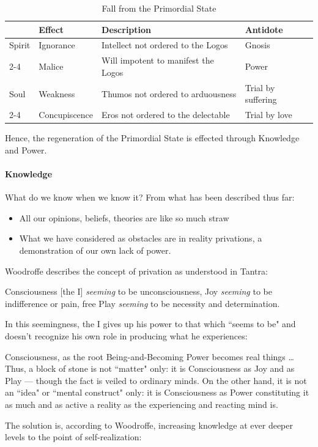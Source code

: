 \begin{table}[h]
\centering\small
\begin{tabularx}{\textwidth}{llp{}l}
\toprule
 &
\textbf{Effect} &
\textbf{Description} &
\textbf{Antidote}\\\midrule
Spirit &
Ignorance &
Intellect not ordered to the Logos &
Gnosis\\\cmidrule{2-4}
 &
Malice &
Will impotent to manifest the Logos &
Power\\\midrule
Soul &
Weakness &
Thumos not ordered to arduousness &
Trial by suffering\\\cmidrule{2-4}
 &
Concupiscence &
Eros not ordered to the delectable &
Trial by love\\\bottomrule
\end{tabularx}
\caption{Fall from the Primordial State}
\label{tab:FallPrimordialState}
\end{table}
Hence, the regeneration of the Primordial State is effected through Knowledge and Power.

\paragraph{Knowledge}
What do we know when we know it? From what has been described thus far:

\begin{itemize}
\item All our opinions, beliefs, theories are like so much straw 
\item What we have considered as obstacles are in reality privations, a demonstration of our own lack of power. 
\end{itemize}
Woodroffe describes the concept of privation as understood in Tantra:

\begin{quotex}
Consciousness [the I] \emph{seeming} to be unconsciousness, Joy \emph{seeming} to be indifference or pain, free Play \emph{seeming} to be necessity and determination. 

\end{quotex}
In this seemingness, the I gives up his power to that which ``seems to be" and doesn't recognize his own role in producing what he experiences:

\begin{quotex}
Consciousness, as the root Being-and-Becoming Power becomes real things … Thus, a block of stone is not ``matter" only: it is Consciousness as Joy and as Play — though the fact is veiled to ordinary minds. On the other hand, it is not an ``idea" or ``mental construct" only: it is Consciousness as Power constituting it as much and as active a reality as the experiencing and reacting mind is. 

\end{quotex}
The solution is, according to Woodroffe, increasing knowledge at ever deeper levels to the point of self-realization:

